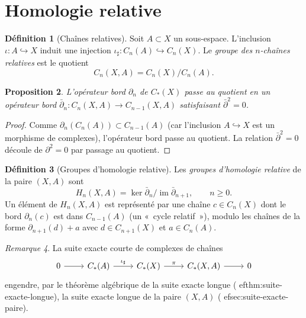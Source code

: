 \documentclass[12pt,a4paper,openany]{book}
\theoremstyle{definition}
\newtheorem{definition}{Définition}[chapter]
\theoremstyle{plain}
\newtheorem{proposition}[definition]{Proposition}
\theoremstyle{remark}
\newtheorem{remarque}[definition]{Remarque}
\DeclareMathOperator{\im}{im}
\begin{document}
\section{Homologie relative}\label{sec:homologie-relative}

\begin{definition}[Chaînes relatives]\label{def:chaines-relatives}
Soit $A \subset X$ un sous-espace. L'inclusion $\iota \colon A \hookrightarrow X$ induit une
injection $\iota_\sharp \colon C_n(A) \hookrightarrow C_n(X)$. Le \emph{groupe des $n$-chaînes relatives}
est le quotient
\[
  C_n(X, A) = C_n(X) / C_n(A).
\]
\end{definition}

\begin{proposition}\label{prop:complexe-relatif}
L'opérateur bord $\partial_n$ de $C_*(X)$ passe au quotient en un opérateur bord
$\bar{\partial}_n \colon C_n(X, A) \to C_{n-1}(X, A)$ satisfaisant $\bar{\partial}^2 = 0$.
\end{proposition}

\begin{proof}
Comme $\partial_n(C_n(A)) \subset C_{n-1}(A)$ (car l'inclusion $A \hookrightarrow X$ est un
morphisme de complexes), l'opérateur bord passe au quotient. La relation $\bar{\partial}^2 = 0$
découle de $\partial^2 = 0$ par passage au quotient.
\end{proof}

\begin{definition}[Groupes d'homologie relative]\label{def:homologie-relative}
Les \emph{groupes d'homologie relative} de la paire $(X, A)$ sont
\[
  H_n(X, A) = \ker \bar{\partial}_n / \im \bar{\partial}_{n+1}, \qquad n \geq 0.
\]
Un élément de $H_n(X, A)$ est représenté par une chaîne $c \in C_n(X)$ dont le bord
$\partial_n(c)$ est dans $C_{n-1}(A)$ (un «~cycle relatif~»), modulo les chaînes de la forme
$\partial_{n+1}(d) + a$ avec $d \in C_{n+1}(X)$ et $a \in C_n(A)$.
\end{definition}

\begin{remarque}\label{rem:paire-ses}
La suite exacte courte de complexes de chaînes
\[
\begin{tikzcd}
  0 \ar[r] & C_*(A) \ar[r, "\iota_\sharp"] & C_*(X) \ar[r, "\pi"] & C_*(X,A) \ar[r] & 0
\end{tikzcd}
\]
engendre, par le théorème algébrique de la suite exacte longue (
ef{thm:suite-exacte-longue}),
la suite exacte longue de la paire $(X, A)$ (
ef{sec:suite-exacte-paire}).
\end{remarque}
\end{document}

